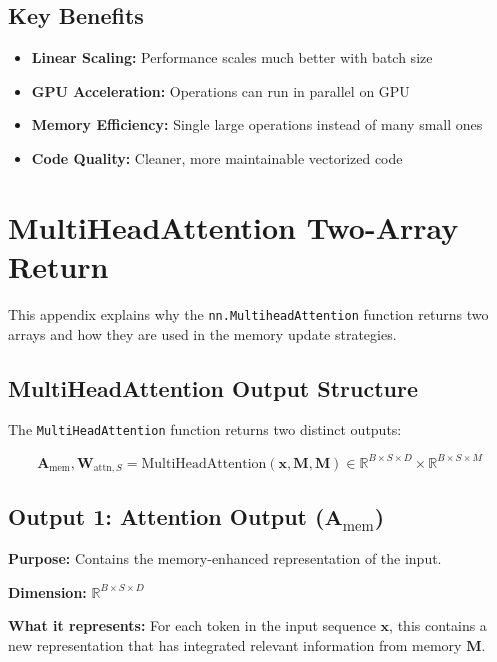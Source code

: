 \documentclass{article}
\begin{document}
\subsection{Key Benefits}

\begin{itemize}
\item \textbf{Linear Scaling:} Performance scales much better with batch size
\item \textbf{GPU Acceleration:} Operations can run in parallel on GPU
\item \textbf{Memory Efficiency:} Single large operations instead of many small ones
\item \textbf{Code Quality:} Cleaner, more maintainable vectorized code
\end{itemize}

\appendix

\section{MultiHeadAttention Two-Array Return}

This appendix explains why the \texttt{nn.MultiheadAttention} function returns two arrays and how they are used in the memory update strategies.

\subsection{MultiHeadAttention Output Structure}

The \texttt{MultiHeadAttention} function returns two distinct outputs:

\begin{equation}
\mathbf{A}_{\text{mem}}, \mathbf{W}_{\text{attn},S} = \text{MultiHeadAttention}(\mathbf{x}, \mathbf{M}, \mathbf{M}) \in \mathbb{R}^{B \times S \times D} \times \mathbb{R}^{B \times S \times M}
\end{equation}

\subsection{Output 1: Attention Output ($\mathbf{A}_{\text{mem}}$)}

\textbf{Purpose:} Contains the memory-enhanced representation of the input.

\textbf{Dimension:} $\mathbb{R}^{B \times S \times D}$

\textbf{What it represents:} For each token in the input sequence $\mathbf{x}$, this contains a new representation that has integrated relevant information from memory $\mathbf{M}$.
\end{document}
